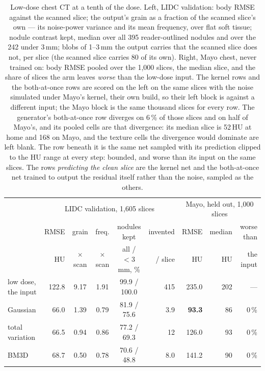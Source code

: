 \begin{table}[H]
\centering
\caption{Low-dose chest CT at a tenth of the dose. Left, LIDC validation: body RMSE against the scanned slice; the output's grain as a fraction of the scanned slice's own --- its noise-power variance and its mean frequency, over flat soft tissue; nodule contrast kept, median over all 395 reader-outlined nodules and over the 242 under 3\,mm; blobs of 1--3\,mm the output carries that the scanned slice does not, per slice (the scanned slice carries 80 of its own). Right, Mayo chest, never trained on: body RMSE pooled over the 1,000 slices, the median slice, and the share of slices the arm leaves \emph{worse} than the low-dose input. The kernel rows and the both-at-once rows are scored on the left on the same slices with the noise simulated under Mayo's kernel, their own build, so their left block is against a different input; the Mayo block is the same thousand slices for every row. The generator's both-at-once row diverges on 6\,\% of those slices and on half of Mayo's, and its pooled cells are that divergence: its median slice is 52\,HU at home and 168 on Mayo, and the texture cells the divergence would dominate are left blank. The row beneath it is the same net sampled with its
prediction clipped to the HU range at every step: bounded, and worse than
its input on the same slices. The rows \emph{predicting the clean slice} are
the kernel net and the both-at-once net trained to output the residual
itself rather than the noise, sampled as the others.}
\label{tab:ct_synthesis}
\footnotesize
\setlength{\tabcolsep}{3pt}
\begin{tabular}{l r c c c r | r r r}
\hline
 & \multicolumn{5}{c|}{LIDC validation, 1,605 slices} & \multicolumn{3}{c}{Mayo, held out, 1,000 slices} \\
 & RMSE & grain & freq. & nodules kept & invented & RMSE & median & worse than \\
 & HU & $\times$ scan & $\times$ scan & all / $<$3\,mm, \% & / slice & HU & HU & the input \\
\hline
low dose, the input            & 122.8 & 9.17 & 1.91 & 99.9 / 100.0 & 415 & 235.0 & 202 & --- \\
Gaussian                       &  66.0 & 1.39 & 0.79 & 81.9 / 75.6 & 3.9 &  \textbf{93.3} &  86 & 0\,\% \\
total variation                &  66.5 & 0.94 & 0.86 & 77.2 / 69.3 &  12 & 126.0 &  93 & 0\,\% \\
BM3D                           &  68.7 & 0.50 & 0.78 & 70.6 / 48.8 & 8.0 & 141.2 &  90 & 0\,\% \\

\end{tabular}
\end{table}
